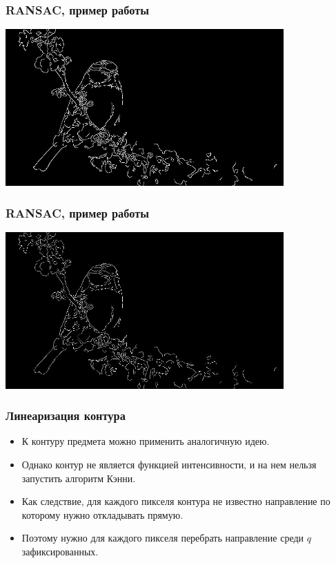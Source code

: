 \begin{frame}\frametitle{RANSAC, пример работы}
    \begin{center}
        \includegraphics[height=6cm]{veselov_imgs/edge_map3.jpg}
    \end{center}
\end{frame}

\begin{frame}\frametitle{RANSAC, пример работы}
    \begin{center}
        \includegraphics[height=6cm]{veselov_imgs/l_edge_map3.jpg}
    \end{center}
\end{frame}

\begin{frame}\frametitle{Линеаризация контура}
    \begin{itemize}
        \item К контуру предмета можно применить аналогичную идею.
        \pause
        \item Однако контур не является функцией интенсивности, и на нем нельзя запустить алгоритм Кэнни.
        \pause
        \item Как следствие, для каждого пикселя контура не известно направление по которому нужно откладывать прямую.
        \pause
        \item Поэтому нужно для каждого пикселя перебрать направление среди $q$ зафиксированных.
    \end{itemize}
\end{frame}

